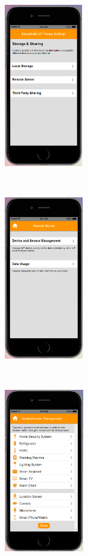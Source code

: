 \begin{figure}
	\centering
	\begin{subfigure}[t]{0.2\textwidth}
		\centering
		\includegraphics[height=2.8in]{figures/ui2sd1.png}
	\end{subfigure}%
	~~~~~
	\begin{subfigure}[t]{0.2\textwidth}
		\centering
		\includegraphics[height=2.8in]{figures/ui2sd2.png}
	\end{subfigure}%
	~~~~~
	\begin{subfigure}[t]{0.2\textwidth}
		\centering
		\includegraphics[height=2.8in]{figures/ui2sd3.png}

\end{subfigure}
\end{figure}
